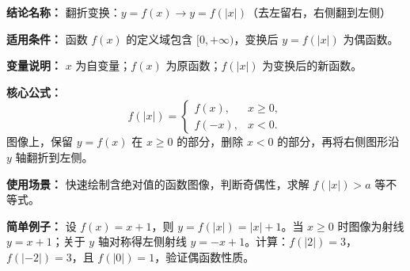 \textbf{结论名称：} 翻折变换：$y=f(x)\rightarrow y=f(|x|)$（去左留右，右侧翻到左侧）

\textbf{适用条件：} 函数 $f(x)$ 的定义域包含 $[0,+\infty)$，变换后 $y=f(|x|)$ 为偶函数。

\textbf{变量说明：} $x$ 为自变量；$f(x)$ 为原函数；$f(|x|)$ 为变换后的新函数。

\textbf{核心公式：} 
\[
\boxed{f(|x|) = \begin{cases}
f(x), & x \ge 0,\\[2pt]
f(-x), & x < 0.
\end{cases}}
\]
图像上，保留 $y=f(x)$ 在 $x\ge 0$ 的部分，删除 $x<0$ 的部分，再将右侧图形沿 $y$ 轴翻折到左侧。

\textbf{使用场景：} 快速绘制含绝对值的函数图像，判断奇偶性，求解 $f(|x|)>a$ 等不等式。

\textbf{简单例子：} 设 $f(x)=x+1$，则 $y=f(|x|)=|x|+1$。当 $x\ge 0$ 时图像为射线 $y=x+1$；关于 $y$ 轴对称得左侧射线 $y=-x+1$。计算：$f(|2|)=3$，$f(|-2|)=3$，且 $f(|0|)=1$，验证偶函数性质。